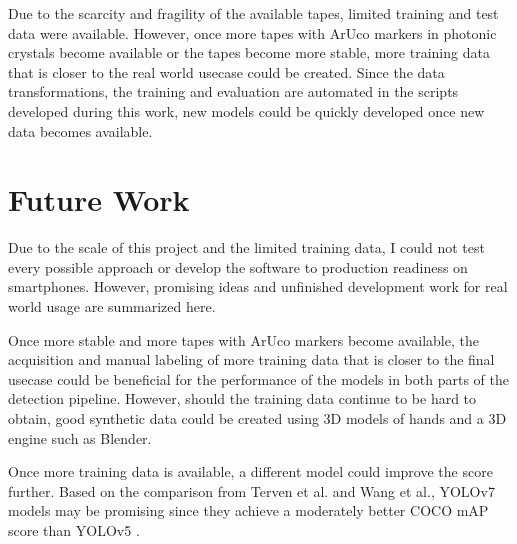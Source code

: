 \documentclass[10pt]{book}
\begin{document}
Due to the scarcity and fragility of the available tapes, limited training and test data were available. However, once more tapes with \ac{ArUco} markers in photonic crystals become available or the tapes become more stable, more training data that is closer to the real world usecase could be created. Since the data transformations, the training and evaluation are automated in the scripts developed during this work, new models could be quickly developed once new data becomes available.

\section{Future Work}

Due to the scale of this project and the limited training data, I could not test every possible approach or develop the software to production readiness on smartphones. However, promising ideas and unfinished development work for real world usage are summarized here.


Once more stable and more tapes with \ac{ArUco} markers become available, the acquisition and manual labeling of more training data that is closer to the final usecase could be beneficial for the performance of the models in both parts of the detection pipeline. %
However, should the training data continue to be hard to obtain, good synthetic data could be created using 3D models of hands and a 3D engine such as Blender.


Once more training data is available, a different model could improve the score further. Based on the comparison from Terven et al. and Wang et al., \ac{YOLO}v7 models may be promising since they achieve a moderately better \ac{COCO} \ac{mAP} score than \ac{YOLO}v5 \cite{terven2023comprehensive, wang2023yolov7}.
\end{document}

